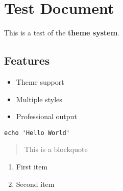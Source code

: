 \documentclass[14pt,a4paper]{article}
\providecommand{\tightlist}{\setlength{\itemsep}{0pt}\setlength{\parskip}{0pt}}
\begin{document}
\section{Test Document}\label{test-document}

This is a test of the \textbf{theme system}.

\subsection{Features}\label{features}

\begin{itemize}
\tightlist
\item
  Theme support
\item
  Multiple styles
\item
  Professional output
\end{itemize}

\begin{verbatim}
echo 'Hello World'
\end{verbatim}

\begin{quote}
This is a blockquote
\end{quote}

\begin{enumerate}
\def\labelenumi{\arabic{enumi}.}
\tightlist
\item
  First item
\item
  Second item
\end{enumerate}
\end{document}
